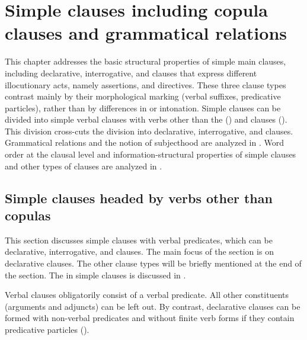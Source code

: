 \chapter{Simple clauses including copula clauses and grammatical relations}
\label{cpt:Simpleclauses}

This chapter addresses the basic structural properties of simple main clauses, including declarative, interrogative,  and  clauses that express different illocutionary acts, namely assertions,  and directives. These three clause types contrast mainly by their morphological marking (verbal suffixes, predicative particles), rather than by differences in  or intonation. Simple clauses can be divided into simple verbal clauses with verbs other than the  () and  clauses (). This division cross-cuts the division into declarative, interrogative,  and  clauses. Grammatical relations and the notion of subjecthood are analyzed in . Word order at the clausal level and information-structural properties of simple clauses and other types of clauses are analyzed in . 



\section{Simple clauses headed by verbs other than copulas}\label{sec:Simple clauses headed by verbs other than copulae}

This section discusses simple clauses with verbal predicates, which can be declarative, interrogative,  and  clauses. The main focus of the section is on declarative clauses. The other clause types will be briefly mentioned at the end of the section. The  in simple clauses is discussed in .

Verbal clauses obligatorily consist of a verbal predicate. All other constituents (arguments and adjuncts) can be left out. By contrast, declarative  clauses can be formed with non-verbal predicates and without finite verb forms if they contain predicative particles ().  

